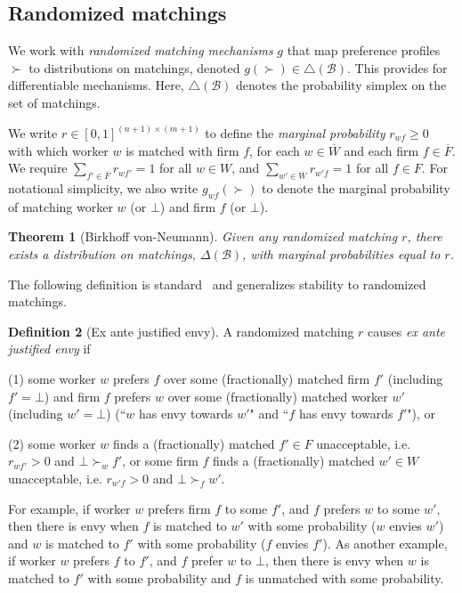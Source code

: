 \documentclass[11pt,letterpaper]{article}
\newtheorem{theorem}{Theorem}
\theoremstyle{definition}
\newtheorem{definition}[theorem]{Definition}
\newcommand{\kibitz}[2]{\ifnum\Comments=1{\color{#1}{#2}}\fi}
\newcommand{\dcp}[1]{\kibitz{orange}{[DCP: #1]}}
\begin{document}
\subsection{Randomized matchings}

We work with {\em randomized matching mechanisms} $g$ that map preference profiles $\succ$ 
   to distributions on matchings, denoted
  $g(\succ)\in \triangle({\mathcal B})$. 
  This provides for differentiable mechanisms.
  Here, 
  $\triangle({\mathcal B})$ denotes the probability simplex on the set
  of matchings.

We  write $r\in [0,1]^{(n+1)\times (m+1)}$ to define  
the {\em marginal probability} $r_{wf}\geq 0$ with which  worker $w$ is matched with firm $f$, for each $w\in \overline{W}$
and each firm $f\in \overline{F}$. We require $\sum_{f'\in \overline{F}} r_{wf'}= 1$ for all $w\in W$, 
and $\sum_{w'\in \overline{W}}r_{w'f}=1$ for all $f\in F$. For notational simplicity, we also write $g_{wf}(\succ)$ to denote the marginal probability of matching worker $w$ (or $\bot$) and firm $f$ (or $\bot$). 
%
\begin{theorem}[Birkhoff von-Neumann]
Given any randomized matching $r$, there exists a distribution on  matchings, $\Delta({\mathcal B})$,
with marginal probabilities equal to $r$.   
\end{theorem}

The following definition is standard~\cite{BCKM13} %
and generalizes stability to randomized matchings.
%
\begin{definition}[Ex ante justified envy]
\label{def:envy}
A randomized matching $r$ causes {\em ex ante justified envy} if

(1) some worker $w$ prefers $f$ over some (fractionally) matched firm $f'$ (including $f'=\bot$) and firm $f$ prefers $w$ over some (fractionally) matched worker $w'$ (including $w'=\bot$) (``$w$ has envy towards $w'$" and   ``$f$ has envy towards  $f'$"), or

(2) some worker $w$ finds a (fractionally) matched $f'\in F$ unacceptable, i.e. $r_{wf'}>0$ and $\bot \succ_w f'$, or some firm $f$ finds a (fractionally)  matched $w'\in W$ unacceptable, i.e. $r_{w'f}>0$ and $\bot \succ_f w'$.
\end{definition}

For example, if  worker $w$  prefers firm $f$ to some  $f'$, and  $f$ prefers  $w$ to some $w'$, then there
is envy when $f$ is matched to $w'$ with some probability ($w$ envies $w'$) and $w$ is matched to $f'$ with some probability ($f$ envies $f'$).
%
As another example, if worker $w$  prefers $f$ to $f'$, and $f$ prefer $w$ to $\bot$, then  there
is  envy when $w$ is matched to $f'$ with some probability and $f$ is unmatched  with some probability. %
%
\fi
\end{document}
